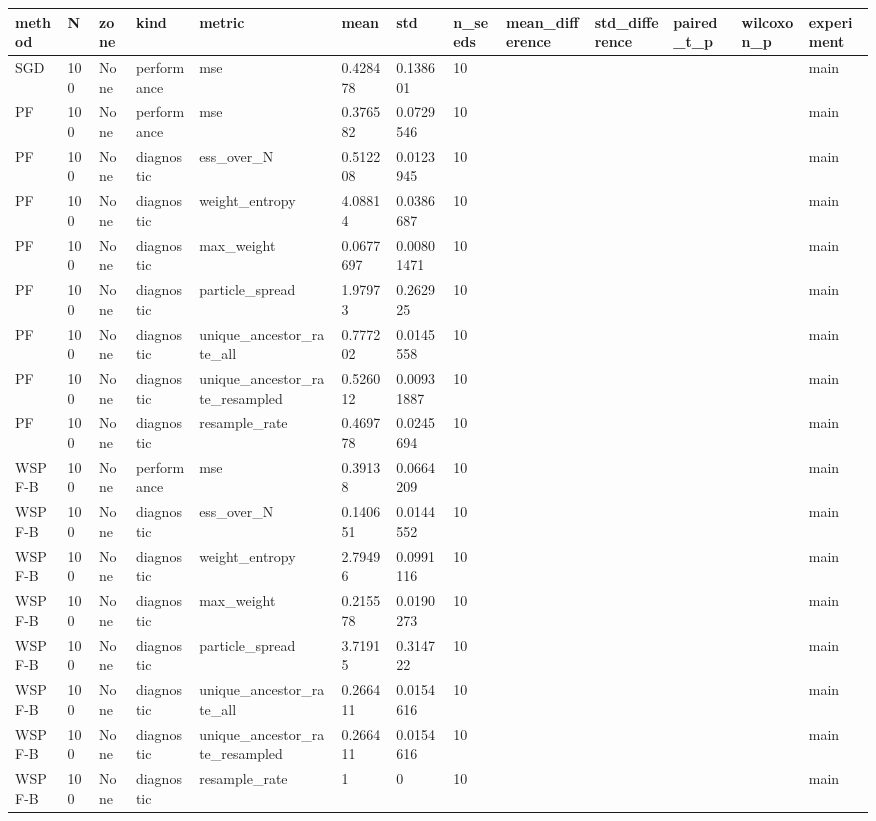 \begin{tabular}{lllllllllllll}
\hline
method & N & zone & kind & metric & mean & std & n\_seeds & mean\_difference & std\_difference & paired\_t\_p & wilcoxon\_p & experiment \\
\hline
SGD & 100 & None & performance & mse & 0.428478 & 0.138601 & 10 &  &  &  &  & main \\
PF & 100 & None & performance & mse & 0.376582 & 0.0729546 & 10 &  &  &  &  & main \\
PF & 100 & None & diagnostic & ess\_over\_N & 0.512208 & 0.0123945 & 10 &  &  &  &  & main \\
PF & 100 & None & diagnostic & weight\_entropy & 4.08814 & 0.0386687 & 10 &  &  &  &  & main \\
PF & 100 & None & diagnostic & max\_weight & 0.0677697 & 0.00801471 & 10 &  &  &  &  & main \\
PF & 100 & None & diagnostic & particle\_spread & 1.97973 & 0.262925 & 10 &  &  &  &  & main \\
PF & 100 & None & diagnostic & unique\_ancestor\_rate\_all & 0.777202 & 0.0145558 & 10 &  &  &  &  & main \\
PF & 100 & None & diagnostic & unique\_ancestor\_rate\_resampled & 0.526012 & 0.00931887 & 10 &  &  &  &  & main \\
PF & 100 & None & diagnostic & resample\_rate & 0.469778 & 0.0245694 & 10 &  &  &  &  & main \\
WSPF-B & 100 & None & performance & mse & 0.39138 & 0.0664209 & 10 &  &  &  &  & main \\
WSPF-B & 100 & None & diagnostic & ess\_over\_N & 0.140651 & 0.0144552 & 10 &  &  &  &  & main \\
WSPF-B & 100 & None & diagnostic & weight\_entropy & 2.79496 & 0.0991116 & 10 &  &  &  &  & main \\
WSPF-B & 100 & None & diagnostic & max\_weight & 0.215578 & 0.0190273 & 10 &  &  &  &  & main \\
WSPF-B & 100 & None & diagnostic & particle\_spread & 3.71915 & 0.314722 & 10 &  &  &  &  & main \\
WSPF-B & 100 & None & diagnostic & unique\_ancestor\_rate\_all & 0.266411 & 0.0154616 & 10 &  &  &  &  & main \\
WSPF-B & 100 & None & diagnostic & unique\_ancestor\_rate\_resampled & 0.266411 & 0.0154616 & 10 &  &  &  &  & main \\
WSPF-B & 100 & None & diagnostic & resample\_rate & 1 & 0 & 10 &  &  &  &  & main \\

\end{tabular}
